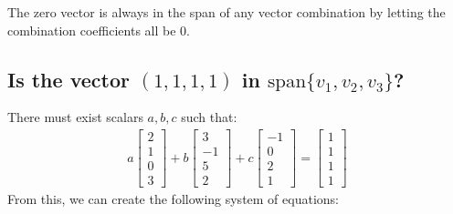 \documentclass[
  letterpaper,
  DIV=11,
  numbers=noendperiod]{scrartcl}
\begin{document}
The zero vector is always in the span of any vector combination by
letting the combination coefficients all be 0.

\subsection{\texorpdfstring{Is the vector \((1, 1, 1, 1)\) in
\(\mathrm{span}\{v_1,v_2,v_3\}\)?}{Is the vector (1, 1, 1, 1) in \textbackslash mathrm\{span\}\textbackslash\{v\_1,v\_2,v\_3\textbackslash\}?}}\label{is-the-vector-1-1-1-1-in-mathrmspanv_1v_2v_3}

There must exist scalars \(a, b, c\) such that: \begin{align*}
a\begin{bmatrix}2 \\ 1 \\ 0 \\ 3\end{bmatrix} + b\begin{bmatrix}3 \\ -1 \\ 5 \\ 2\end{bmatrix} + c\begin{bmatrix}-1 \\ 0 \\ 2 \\ 1\end{bmatrix} = \begin{bmatrix}1 \\ 1 \\ 1 \\ 1\end{bmatrix}
\end{align*} From this, we can create the following system of equations:
\end{document}
